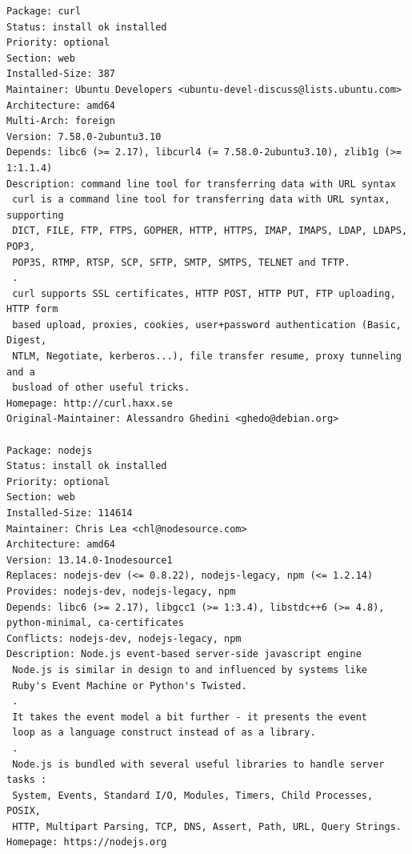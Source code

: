 \documentclass[12pt,vi]{mitthesis}
\begin{document}
\begin{lstlisting}[style=BashInputStyle]
Package: curl
Status: install ok installed
Priority: optional
Section: web
Installed-Size: 387
Maintainer: Ubuntu Developers <ubuntu-devel-discuss@lists.ubuntu.com>
Architecture: amd64
Multi-Arch: foreign
Version: 7.58.0-2ubuntu3.10
Depends: libc6 (>= 2.17), libcurl4 (= 7.58.0-2ubuntu3.10), zlib1g (>= 1:1.1.4)
Description: command line tool for transferring data with URL syntax
 curl is a command line tool for transferring data with URL syntax, supporting
 DICT, FILE, FTP, FTPS, GOPHER, HTTP, HTTPS, IMAP, IMAPS, LDAP, LDAPS, POP3,
 POP3S, RTMP, RTSP, SCP, SFTP, SMTP, SMTPS, TELNET and TFTP.
 .
 curl supports SSL certificates, HTTP POST, HTTP PUT, FTP uploading, HTTP form
 based upload, proxies, cookies, user+password authentication (Basic, Digest,
 NTLM, Negotiate, kerberos...), file transfer resume, proxy tunneling and a
 busload of other useful tricks.
Homepage: http://curl.haxx.se
Original-Maintainer: Alessandro Ghedini <ghedo@debian.org>

Package: nodejs
Status: install ok installed
Priority: optional
Section: web
Installed-Size: 114614
Maintainer: Chris Lea <chl@nodesource.com>
Architecture: amd64
Version: 13.14.0-1nodesource1
Replaces: nodejs-dev (<= 0.8.22), nodejs-legacy, npm (<= 1.2.14)
Provides: nodejs-dev, nodejs-legacy, npm
Depends: libc6 (>= 2.17), libgcc1 (>= 1:3.4), libstdc++6 (>= 4.8), python-minimal, ca-certificates
Conflicts: nodejs-dev, nodejs-legacy, npm
Description: Node.js event-based server-side javascript engine
 Node.js is similar in design to and influenced by systems like
 Ruby's Event Machine or Python's Twisted.
 .
 It takes the event model a bit further - it presents the event
 loop as a language construct instead of as a library.
 .
 Node.js is bundled with several useful libraries to handle server tasks :
 System, Events, Standard I/O, Modules, Timers, Child Processes, POSIX,
 HTTP, Multipart Parsing, TCP, DNS, Assert, Path, URL, Query Strings.
Homepage: https://nodejs.org


\end{lstlisting}
\end{document}
